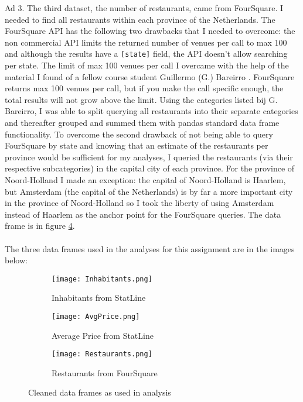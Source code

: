 Ad 3. The third dataset, the number of restaurants, came from FourSquare. I needed to find all restaurants within each province of the Netherlands. The FourSquare API has the following two drawbacks that I needed to overcome: the non commercial API limits the returned number of venues per call to max 100 and although the results have a \texttt{[state]} field, the API doesn't allow searching per state. The limit of max 100 venues per call I overcame with the help of the material I found of a fellow course student Guillermo (G.) Bareirro \cite{STUDENT1}. FourSquare returns max 100 venues per call, but if you make the call specific enough, the total results will not grow above the limit. Using the categories listed bij G. Bareirro, I was able to split querying all restaurants into their separate categories and thereafter grouped and summed them with pandas standard data frame functionality. To overcome the second drawback of not being able to query FourSquare by state and knowing that an estimate of the restaurants per province would be sufficient for my analyses, I queried the restaurants (via their respective subcategories) in the capital city of each province. For the province of Noord-Holland I made an exception: the capital of Noord-Holland is Haarlem, but Amsterdam (the capital of the Netherlands) is by far a more important city in the province of Noord-Holland so I took the liberty of using Amsterdam instead of Haarlem as the anchor point for the FourSquare queries. The data frame is in figure \ref{restaurants}.
\\\\
The three data frames used in the analyses for this assignment are in the images below:
\medskip
\begin{figure}[H]
	\begin{subfigure}{0.33\textwidth}
		\centering
		\texttt{[image: Inhabitants.png]} 
		\caption{Inhabitants from StatLine \cite{CBS1}}
		\label{inhabitant}
	\end{subfigure}
	\begin{subfigure}{0.33\textwidth} 
		\centering 
		\texttt{[image: AvgPrice.png]} 
		\caption{Average Price from StatLine \cite{CBS2}}
		\label{avgprice}
	\end{subfigure}
	\begin{subfigure}{0.33\textwidth}
		\centering
		\texttt{[image: Restaurants.png]} 
		\caption{Restaurants from FourSquare \cite{FS2}}
		\label{restaurants}
	\end{subfigure}
\caption{Cleaned data frames as used in analysis}
\end{figure}
